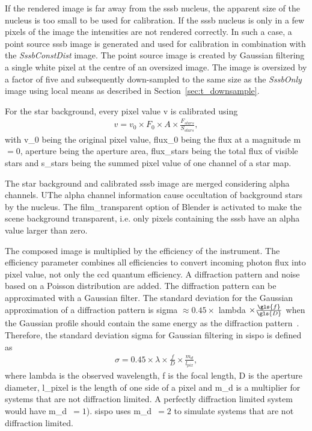 If the rendered image is far away from the \gls{sssb} nucleus, the apparent size of the nucleus is too small to be used for calibration. If the \gls{sssb} nucleus is only in a few pixels of the image the intensities are not rendered correctly. In such a case, a point source \gls{sssb} image is generated and used for calibration in combination with the \textit{SssbConstDist} image. The point source image is created by Gaussian filtering a single white pixel at the centre of an oversized image. The image is oversized by a factor of five and subsequently down-sampled to the same size as the \textit{SssbOnly} image using local means as described in Section~\ref{sec:t_downsample}.

For the star background, every pixel value \gls{v} is calibrated using
\begin{align}
        v = v_0 \times F_0 \times A \times \frac{F_{stars}}{S_{stars}}, \label{eq:comp_cal_starmap}
\end{align}
with \gls{v_0} being the original pixel value, \gls{flux_0} being the flux at a magnitude \gls{m}$ = 0$, \gls{aperture} being the aperture area, \gls{flux_stars} being the total flux of visible stars and \gls{s_stars} being the summed pixel value of one channel of a star map.

The star background and calibrated \gls{sssb} image are merged considering alpha channels. UThe alpha channel information cause occultation of background stars by the nucleus. The film\_transparent option of Blender is activated to make the scene background transparent, i.e. only pixels containing the \gls{sssb} have an alpha value larger than zero.

The composed image is multiplied by the efficiency of the instrument. The efficiency parameter combines all efficiencies to convert incoming photon flux into pixel value, not only the \gls{ccd} quantum efficiency. A diffraction pattern and noise based on a Poisson distribution are added. The diffraction pattern can be approximated with a Gaussian filter. The standard deviation for the Gaussian approximation of a diffraction pattern is \gls{sigma} $\approx 0.45 \times$ \gls{lambda} $\times \frac{\gls{f}}{\gls{D}}$ when the Gaussian profile should contain the same energy as the diffraction pattern~\cite{Zhang2007GaussianModels}. Therefore, the standard deviation \gls{sigma} for Gaussian filtering in \gls{sispo} is defined as
\begin{align}
    \sigma = 0.45 \times \lambda \times \frac{f}{D} \times \frac{m_d}{l_{pix}}, \label{eq:comp_sigma}
\end{align}
where \gls{lambda} is the observed wavelength, \gls{f} is the focal length, \gls{D} is the aperture diameter, \gls{l_pixel} is the length of one side of a pixel and \gls{m_d} is a multiplier for systems that are not diffraction limited. A perfectly diffraction limited system would have \gls{m_d}~$= 1$). \Gls{sispo} uses \gls{m_d}~$= 2$ to simulate systems that are not diffraction limited. 

